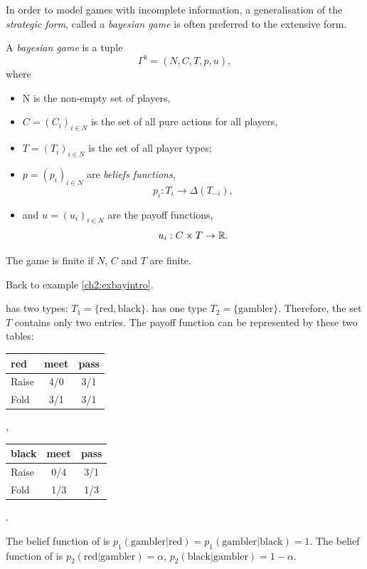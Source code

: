 In order to model games with incomplete information, a generalisation of the \emph{strategic form}, called a \emph{bayesian game} is often preferred to the extensive form.

\begin{definition}
A \emph{bayesian game} is a tuple $$\Gamma^b = (N,C,T,p,u), $$
where
\begin{itemize}
\item N is the non-empty set of players,
\item $C = (C_i)_{i \in N}$ is the set of all pure actions for all players,
\item $T = (T_i)_{i \in N}$ is the set of all player types;
\item $p = (p_i)_{i \in N}$ are \emph{beliefs functions},
$$ p_i : T_i \rightarrow \Delta(T_{-i}),$$
\item and $u = (u_i)_{i \in N}$ are the payoff functions,
$$ u_i : C \times T \rightarrow \mathbb{R}. $$
\end{itemize}
The game is finite if $N$, $C$ and $T$ are finite.
\end{definition}
 \begin{example}
 Back to example \ref{ch2:exbayintro}.

 \TAtwo{} has two types: $T_1 = \{\text{red}, \text{black}\}$. \TAone{} has one type $T_2  =\{\text{gambler}\}$. Therefore, the set $T$ contains only two entries.
 The payoff function can be represented by these two tables:
\begin{center}
\begin{tabular}{l|cc}
red & meet & pass \\
\hline
Raise & 4/0 & 3/1 \\
Fold  & 3/1 & 3/1 \\
\end{tabular}, $\qquad$
\begin{tabular}{l|cc}
black & meet & pass \\
\hline
Raise & 0/4 & 3/1 \\
Fold  & 1/3 & 1/3 \\
\end{tabular}.
\end{center}


 The belief function of \TAtwo{} is $p_1(\text{gambler}|\text{red}) = p_1(\text{gambler}|\text{black}) = 1.$
The belief function of \TAone{} is $p_2(\text{red} | \text{gambler}) = \alpha$,  $p_2(\text{black}|\text{gambler}) = 1-\alpha$.
 \end{example}

